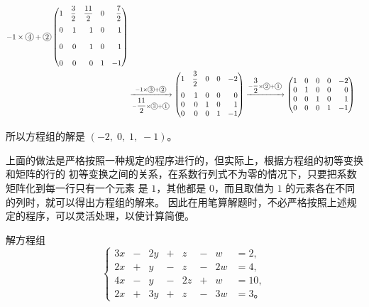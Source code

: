 \begin{align*}
{\begin{gathered}
                -1 \times \tc{4} + \tc{2}
            \end{gathered}
        }
        \begin{pmatrix*}[r]
            1 & \dfrac{3}{2} & \dfrac{11}{2} & 0 & \dfrac{7}{2} \\[1em]
            0 &  1 &   1 &  0 & 1 \\[1em]
            0 &  0 &   1 &  0 & 1 \\[1em]
            0 &  0 &   0 &  1 & -1
        \end{pmatrix*} \\
    & \xrightarrow[-\dfrac{11}{2} \times \tc{3} + \tc{1}]{-1 \times \tc{3} + \tc{2}}
    \begin{pmatrix*}[r]
        1 & \dfrac{3}{2} & 0 & 0 & -2 \\[1em]
        0 &  1 &   0 &  0 & 0 \\
        0 &  0 &   1 &  0 & 1 \\
        0 &  0 &   0 &  1 & -1
    \end{pmatrix*}
    \xrightarrow{-\dfrac{3}{2} \times \tc{2} + \tc{1}}
    \begin{pmatrix*}[r]
        1 &  0 &   0 &  0 & -2 \\
        0 &  1 &   0 &  0 & 0 \\
        0 &  0 &   1 &  0 & 1 \\
        0 &  0 &   0 &  1 & -1
    \end{pmatrix*}
\end{align*}

所以方程组的解是 $(-2,\; 0,\; 1,\; -1)$。

上面的做法是严格按照一种规定的程序进行的，但实际上，根据方程组的初等变换和矩阵的行的
初等变换之间的关系，在系数行列式不为零的情况下，只要把系数矩阵化到每一行只有一个元素
是 $1$，其他都是 $0$，而且取值为 $1$ 的元素各在不同的列时，就可以得出方程组的解来。
因此在用笔算解题时，不必严格按照上述规定的程序，可以灵活处理，以使计算简便。

\liti 解方程组
$$\left\{
    \begin{alignedat}{4}
        3x & -{} & 2y & +{} &  z & -{} &  w & = 2, \\
        2x & +{} &  y & -{} &  z & -{} & 2w & = 4, \\
        4x & -{} &  y & -{} & 2z & +{} &  w & = 10, \\
        2x & +{} & 3y & +{} &  z & -{} & 3w & = 3 \text{。}
    \end{alignedat}
\right.$$

